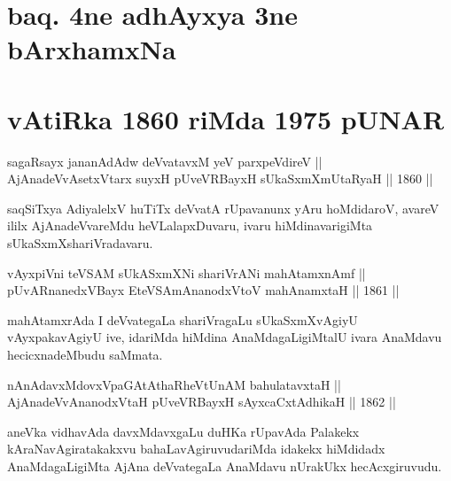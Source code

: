 \section*{baq. 4ne adhAyxya 3ne bArxhamxNa}

\section*{vAtiRka 1860 riMda 1975 pUNAR}


\begin{shl}
sagaRsayx jananAdAdw deVvatavxM yeV parxpeVdireV || \\
AjAnadeVvAsetxV\s tarx suyxH pUveVRBayxH sUkaSxmXmUtaRyaH \hfill || 1860 ||
  
\end{shl}

\begin{artha}
saqSiTxya AdiyalelxV huTiTx deVvatA rUpavanunx yAru hoMdidaroV, avareV
ililx AjAnadeVvareMdu heVLalapxDuvaru, ivaru hiMdinavarigiMta
sUkaSxmXshariVradavaru.
\end{artha}


\begin{shl}
vAyxpiVni teVSAM sUkASxmXNi shariVrANi mahAtamxnAmf || \\
pUvARnanedxVBayx EteVSAmAnanodxV\s toV mahAnamxtaH \hfill || 1861 ||
  
\end{shl}

\begin{artha}
mahAtamxrAda I deVvategaLa shariVragaLu sUkaSxmXvAgiyU vAyxpakavAgiyU
ive, idariMda hiMdina AnaMdagaLigiMtalU ivara AnaMdavu hecicxnadeMbudu
saMmata.
\end{artha}

\begin{shl}
nAnAdavxMdovxVpaGAtAthaRheVtUnAM bahulatavxtaH || \\
AjAnadeVvAnanodxV\s taH pUveVRBayxH sAyxcaCxtAdhikaH \hfill || 1862 ||
  
\end{shl}

\begin{artha}
aneVka vidhavAda davxMdavxgaLu duHKa rUpavAda Palakekx kAraNavAgiratakakxvu bahaLavAgiruvudariMda idakekx hiMdidadx AnaMdagaLigiMta AjAna deVvategaLa AnaMdavu nUrakUkx hecAcxgiruvudu.
\end{artha}

